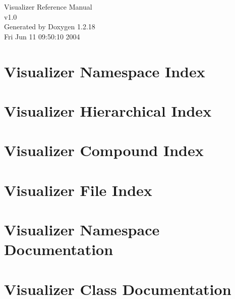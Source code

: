 \documentclass[a4paper]{book}
\begin{document}
\begin{titlepage}
\vspace*{7cm}
\begin{center}
{\Large Visualizer Reference Manual\\[1ex]\large v1.0}\\
\vspace*{1cm}
{\large Generated by Doxygen 1.2.18}\\
\vspace*{0.5cm}
{\small Fri Jun 11 09:50:10 2004}\\
\end{center}
\end{titlepage}
\clearemptydoublepage
{}
\tableofcontents
\clearemptydoublepage
{}
\chapter{Visualizer Namespace Index}

\chapter{Visualizer Hierarchical Index}

\chapter{Visualizer Compound Index}

\chapter{Visualizer File Index}

\chapter{Visualizer Namespace Documentation}

\chapter{Visualizer Class Documentation}














\end{document}
